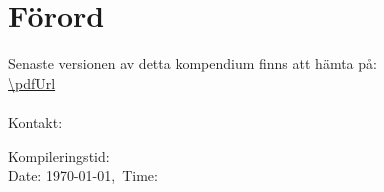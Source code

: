 \section*{Förord}
Senaste versionen av detta kompendium finns att hämta på:\\
\url{\pdfUrl}\\
\qrcode[height=1in]{\pdfUrl}\\


\noindent
Kontakt: \email

\noindent
Kompileringstid:\\ %
\noindent
Date: \today,\ Time: \currenttime